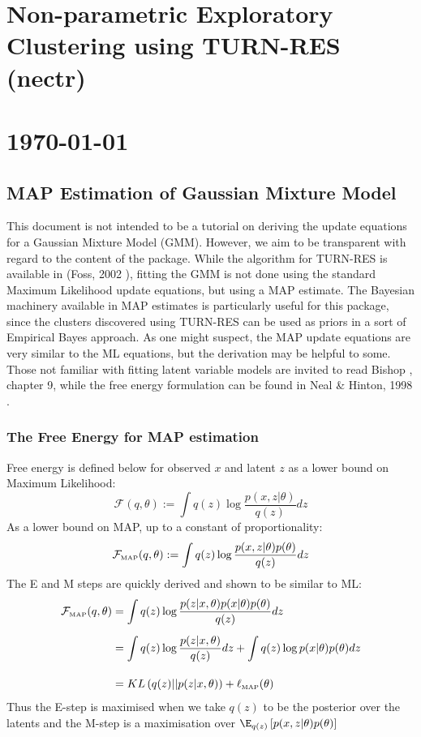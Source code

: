 \documentclass[11pt]{article}
\begin{document}
\section*{Non-parametric Exploratory Clustering using TURN-RES (nectr)}
\section*{\today}
\vspace*{20pt}

\subsection{MAP Estimation of Gaussian Mixture Model}
This document is not intended to be a tutorial on deriving the update equations for a Gaussian Mixture Model (GMM). However, we aim to be transparent with regard to the content of the package. While the algorithm for TURN-RES is available in (Foss, 2002 \cite{F02}), fitting the GMM is not done using the standard Maximum Likelihood update equations, but using a MAP estimate. The Bayesian machinery available in MAP estimates is particularly useful for this package, since the clusters discovered using TURN-RES can be used as priors in a sort of Empirical Bayes approach. As one might suspect, the MAP update equations are very similar to the ML equations, but the derivation may be helpful to some. Those not familiar with fitting latent variable models are invited to read Bishop \cite{B06}, chapter 9, while the free energy formulation can be found in Neal \& Hinton, 1998 \cite{N98}.

\subsubsection{The Free Energy for MAP estimation}
Free energy is defined below for observed $x$ and latent $z$ as a lower bound on Maximum Likelihood:
$$ \mathcal{F}(q, \theta) := \int q(z) \log \frac{p(x, z|\theta)}{q(z)}dz $$
As a lower bound on MAP, up to a constant of proportionality:
$$ \mathcal{F}_{\text{\tiny{MAP}}}(q, \theta) := \int q(z) \log \frac{p(x, z|\theta) p(\theta)}{q(z)}dz $$
The E and M steps are quickly derived and shown to be similar to ML:
\begin{align*}
\mathcal{F}_{\text{\tiny{MAP}}}(q, \theta) &=  \int q(z) \log \frac{p(z| x, \theta) p(x |\theta) p(\theta)}{q(z)}dz\\[5pt]
&=  \int q(z) \log \frac{p(z| x, \theta)}{q(z)}dz + \int q(z) \log p(x |\theta) p(\theta) dz \\[10pt]
&=  KL\left(q(z)||p(z|x,\theta)\right) + \ell_{\text{\tiny{MAP}}}(\theta)
\end{align*}
Thus the E-step is maximised when we take $q(z)$ to be the posterior over the latents and the M-step is a maximisation over $\E_{q(z)} \left[p(x, z|\theta) p(\theta)\right]$
\\[20pt]
\end{document}
